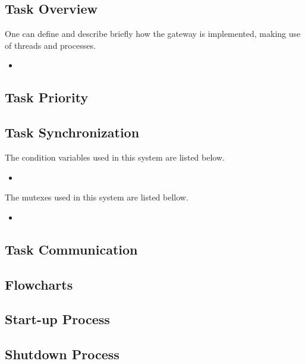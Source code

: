 \subsection{Task Overview}
One can define and describe briefly how the gateway is implemented, making use of threads and processes.

\begin{itemize}
	\item 
\end{itemize}

\subsection{Task Priority}

\subsection{Task Synchronization}

The condition variables used in this system are listed below.

\begin{itemize}
	\item
		
\end{itemize}

The mutexes used in this system are listed bellow.

\begin{itemize}
	\item 
	
\end{itemize}


\subsection{Task Communication}

\subsection{Flowcharts}


\subsection{Start-up Process}

\subsection{Shutdown Process}
